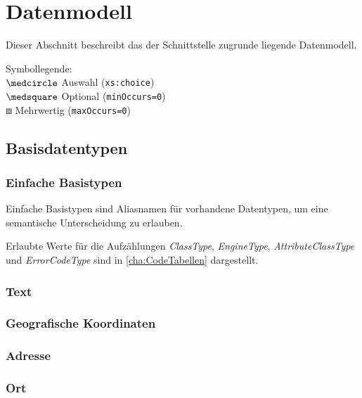 \chapter{Datenmodell}
\label{cha:Datenmodell}
Dieser Abschnitt beschreibt das der Schnittstelle zugrunde liegende Datenmodell. \medskip

\noindent Symbollegende:\\
$\medcircle$ Auswahl (\verb|xs:choice|)\\
$\medsquare$ Optional (\verb|minOccurs=0|)\\
$\boxbox$ Mehrwertig (\verb|maxOccurs=0|)\\


\section{Basisdatentypen}
\label{sec:Datenmodell:Basisdatentypen}

\subsection*{Einfache Basistypen}
Einfache Basistypen sind Aliasnamen für vorhandene Datentypen, um eine semantische Unterscheidung zu erlauben.


Erlaubte Werte für die Aufzählungen \emph{ClassType}, \emph{EngineType}, \emph{AttributeClassType} und \emph{ErrorCodeType} sind in \autoref{cha:CodeTabellen} dargestellt.

\subsection*{Text}



\subsection*{Geografische Koordinaten}



\subsection*{Adresse}



\subsection*{Ort}




